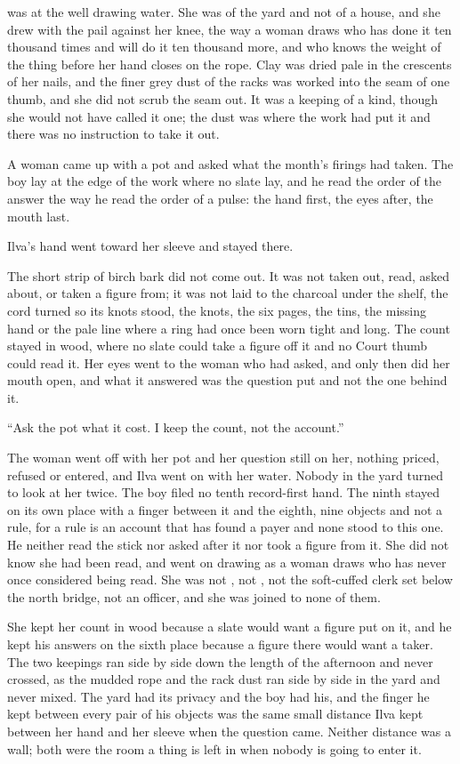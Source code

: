  was at the well drawing water. She was of the yard and not of a house, and she drew with the pail against her knee, the way a woman draws who has done it ten thousand times and will do it ten thousand more, and who knows the weight of the thing before her hand closes on the rope. Clay was dried pale in the crescents of her nails, and the finer grey dust of the racks was worked into the seam of one thumb, and she did not scrub the seam out. It was a keeping of a kind, though she would not have called it one; the dust was where the work had put it and there was no instruction to take it out.

A woman came up with a pot and asked what the month's firings had taken. The boy lay at the edge of the work where no slate lay, and he read the order of the answer the way he read the order of a pulse: the hand first, the eyes after, the mouth last.

Ilva's hand went toward her sleeve and stayed there.

The short strip of birch bark did not come out. It was not taken out, read, asked about, or taken a figure from; it was not laid to the charcoal under the shelf, the cord turned so its knots stood, the knots, the six pages, the tins, the missing hand or the pale line where a ring had once been worn tight and long. The count stayed in wood, where no slate could take a figure off it and no Court thumb could read it. Her eyes went to the woman who had asked, and only then did her mouth open, and what it answered was the question put and not the one behind it.

“Ask the pot what it cost. I keep the count, not the account.”

The woman went off with her pot and her question still on her, nothing priced, refused or entered, and Ilva went on with her water. Nobody in the yard turned to look at her twice. The boy filed no tenth record-first hand. The ninth stayed on its own place with a finger between it and the eighth, nine objects and not a rule, for a rule is an account that has found a payer and none stood to this one. He neither read the stick nor asked after it nor took a figure from it. She did not know she had been read, and went on drawing as a woman draws who has never once considered being read. She was not , not , not the soft-cuffed clerk set below the north bridge, not an officer, and she was joined to none of them.

She kept her count in wood because a slate would want a figure put on it, and he kept his answers on the sixth place because a figure there would want a taker. The two keepings ran side by side down the length of the afternoon and never crossed, as the mudded rope and the rack dust ran side by side in the yard and never mixed. The yard had its privacy and the boy had his, and the finger he kept between every pair of his objects was the same small distance Ilva kept between her hand and her sleeve when the question came. Neither distance was a wall; both were the room a thing is left in when nobody is going to enter it.

